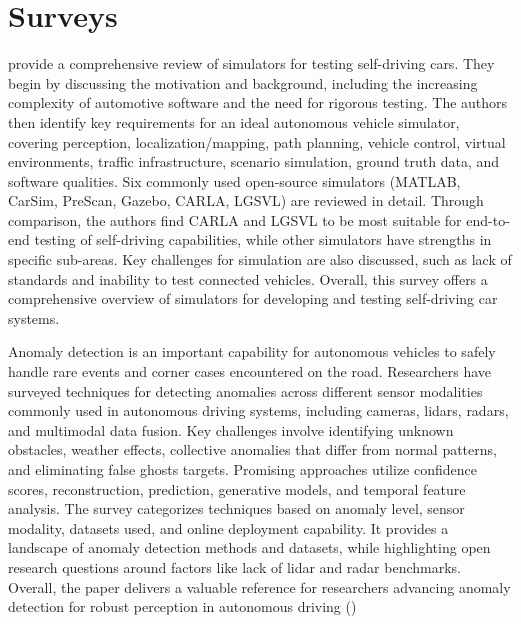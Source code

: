 \section{Surveys}


\cite{kaur2021survey} provide a comprehensive review of simulators for testing self-driving cars. They begin by discussing the motivation and background, including the increasing complexity of automotive software and the need for rigorous testing. The authors then identify key requirements for an ideal autonomous vehicle simulator, covering perception, localization/mapping, path planning, vehicle control, virtual environments, traffic infrastructure, scenario simulation, ground truth data, and software qualities. Six commonly used open-source simulators (MATLAB, CarSim, PreScan, Gazebo, CARLA, LGSVL) are reviewed in detail. Through comparison, the authors find CARLA and LGSVL to be most suitable for end-to-end testing of self-driving capabilities, while other simulators have strengths in specific sub-areas. Key challenges for simulation are also discussed, such as lack of standards and inability to test connected vehicles. Overall, this survey offers a comprehensive overview of simulators for developing and testing self-driving car systems.


Anomaly detection is an important capability for autonomous vehicles to safely handle rare events and corner cases encountered on the road. Researchers have surveyed techniques for detecting anomalies across different sensor modalities commonly used in autonomous driving systems, including cameras, lidars, radars, and multimodal data fusion. Key challenges involve identifying unknown obstacles, weather effects, collective anomalies that differ from normal patterns, and eliminating false ghosts targets. Promising approaches utilize confidence scores, reconstruction, prediction, generative models, and temporal feature analysis. The survey categorizes techniques based on anomaly level, sensor modality, datasets used, and online deployment capability. It provides a landscape of anomaly detection methods and datasets, while highlighting open research questions around factors like lack of lidar and radar benchmarks. Overall, the paper delivers a valuable reference for researchers advancing anomaly detection for robust perception in autonomous driving (\cite{bogdoll2022anomaly})

